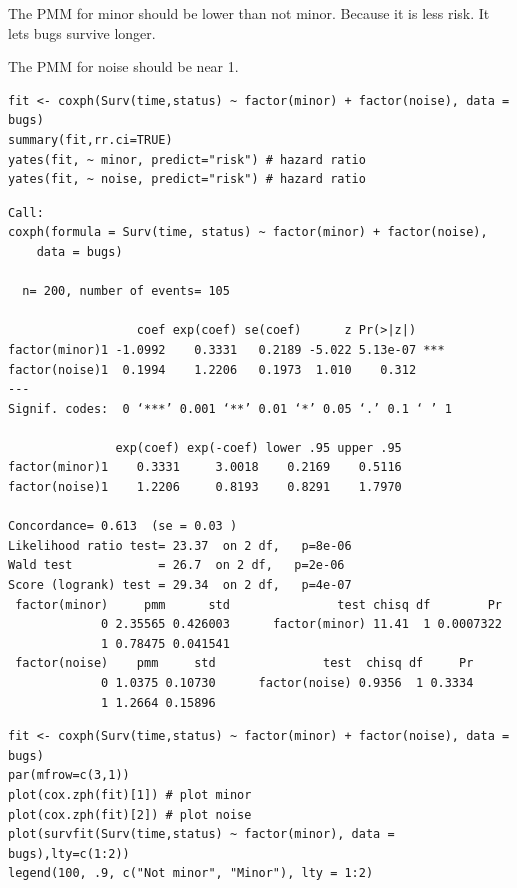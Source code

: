 \documentclass[11pt]{article}
\begin{document}
The PMM for minor should be lower than not minor. Because it is less risk. It lets bugs survive longer.

The PMM for noise should be near 1.

\begin{verbatim}
fit <- coxph(Surv(time,status) ~ factor(minor) + factor(noise), data = bugs)
summary(fit,rr.ci=TRUE)
yates(fit, ~ minor, predict="risk") # hazard ratio
yates(fit, ~ noise, predict="risk") # hazard ratio
\end{verbatim}

\begin{verbatim}
Call:
coxph(formula = Surv(time, status) ~ factor(minor) + factor(noise), 
    data = bugs)

  n= 200, number of events= 105 

                  coef exp(coef) se(coef)      z Pr(>|z|)    
factor(minor)1 -1.0992    0.3331   0.2189 -5.022 5.13e-07 ***
factor(noise)1  0.1994    1.2206   0.1973  1.010    0.312    
---
Signif. codes:  0 ‘***’ 0.001 ‘**’ 0.01 ‘*’ 0.05 ‘.’ 0.1 ‘ ’ 1

               exp(coef) exp(-coef) lower .95 upper .95
factor(minor)1    0.3331     3.0018    0.2169    0.5116
factor(noise)1    1.2206     0.8193    0.8291    1.7970

Concordance= 0.613  (se = 0.03 )
Likelihood ratio test= 23.37  on 2 df,   p=8e-06
Wald test            = 26.7  on 2 df,   p=2e-06
Score (logrank) test = 29.34  on 2 df,   p=4e-07
 factor(minor)     pmm      std               test chisq df        Pr
             0 2.35565 0.426003      factor(minor) 11.41  1 0.0007322
             1 0.78475 0.041541
 factor(noise)    pmm     std               test  chisq df     Pr
             0 1.0375 0.10730      factor(noise) 0.9356  1 0.3334
             1 1.2664 0.15896
\end{verbatim}

\begin{verbatim}
fit <- coxph(Surv(time,status) ~ factor(minor) + factor(noise), data = bugs)
par(mfrow=c(3,1))
plot(cox.zph(fit)[1]) # plot minor
plot(cox.zph(fit)[2]) # plot noise
plot(survfit(Surv(time,status) ~ factor(minor), data = bugs),lty=c(1:2))
legend(100, .9, c("Not minor", "Minor"), lty = 1:2)
\end{verbatim}
\end{document}
